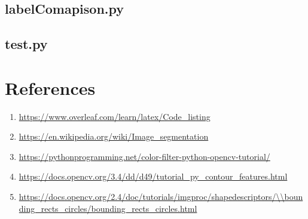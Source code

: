 \documentclass[12pt]{article}
\begin{document}
\subsection{labelComapison.py}


\subsection{test.py}


\newpage

\section{References}

\begin{enumerate}
\item \url{https://www.overleaf.com/learn/latex/Code\_listing}
\item \url{https://en.wikipedia.org/wiki/Image\_segmentation}
\item \url{https://pythonprogramming.net/color-filter-python-opencv-tutorial/}
\item \url{https://docs.opencv.org/3.4/dd/d49/tutorial\_py\_contour\_features.html}
\item \url{https://docs.opencv.org/2.4/doc/tutorials/imgproc/shapedescriptors/\\bounding\_rects\_circles/bounding\_rects\_circles.html}
\end{enumerate}
\end{document}
